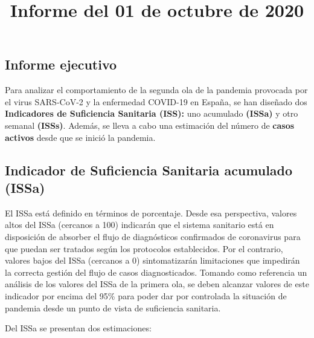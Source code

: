 \documentclass[
  11pt,
]{article}
\title{Informe del 01 de octubre de 2020}
\author{}
\date{\vspace{-2.5em}}
\begin{document}
\maketitle

\renewcommand{\figurename}{Figura}
\renewcommand{\tablename}{Tabla}

\vspace{-0.5cm}

\hypertarget{informe-ejecutivo}{%
\subsection{Informe ejecutivo}\label{informe-ejecutivo}}

Para analizar el comportamiento de la segunda ola de la pandemia
provocada por el virus SARS-CoV-2 y la enfermedad COVID-19 en España, se
han diseñado dos \textbf{Indicadores de Suficiencia Sanitaria (ISS):}
uno acumulado \textbf{(ISSa)} y otro semanal \textbf{(ISSs)}. Además, se
lleva a cabo una estimación del número de \textbf{casos activos} desde
que se inició la pandemia.

\hypertarget{indicador-de-suficiencia-sanitaria-acumulado-issa}{%
\subsection{Indicador de Suficiencia Sanitaria acumulado
(ISSa)}\label{indicador-de-suficiencia-sanitaria-acumulado-issa}}

El ISSa está definido en términos de porcentaje. Desde esa perspectiva,
valores altos del ISSa (cercanos a 100) indicarán que el sistema
sanitario está en disposición de absorber el flujo de diagnósticos
confirmados de coronavirus para que puedan ser tratados según los
protocolos establecidos. Por el contrario, valores bajos del ISSa
(cercanos a 0) sintomatizarán limitaciones que impedirán la correcta
gestión del flujo de casos diagnosticados. Tomando como referencia un
análisis de los valores del ISSa de la primera ola, se deben alcanzar
valores de este indicador por encima del 95\% para poder dar por
controlada la situación de pandemia desde un punto de vista de
suficiencia sanitaria.

Del ISSa se presentan dos estimaciones:
\end{document}
